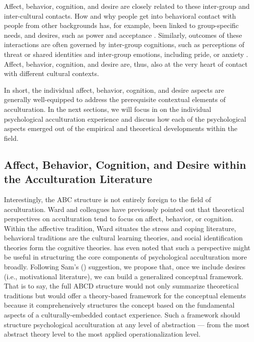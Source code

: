 \documentclass[man, 12pt, a4paper, mask]{apa7}
\begin{document}
Affect, behavior, cognition, and desire are closely related to these inter-group and inter-cultural contacts. How and why people get into behavioral contact with people from other backgrounds has, for example, been linked to group-specific needs, and desires, such as power and acceptance \citep[e.g.,][]{Hassler2021, Shnabel2008a}. Similarly, outcomes of these interactions are often governed by inter-group cognitions, such as perceptions of threat or shared identities \citep[e.g.,][]{Dovidio2017, Stephan2000a} and inter-group emotions, including pride, or anxiety \citep[e.g.,][]{Iyer2008, Stephan1992}. Affect, behavior, cognition, and desire are, thus, also at the very heart of contact with different cultural contexts.

In short, the individual affect, behavior, cognition, and desire aspects are generally well-equipped to address the prerequisite contextual elements of acculturation. In the next sections, we will focus in on the individual psychological acculturation experience and discuss how each of the psychological aspects emerged out of the empirical and theoretical developments within the field. 

\subsection{Affect, Behavior, Cognition, and Desire within the Acculturation Literature}
Interestingly, the ABC structure is not entirely foreign to the field of acculturation. Ward and colleagues \citep{Ward2001, Masgoret2006, Ward2019} have previously pointed out that theoretical perspectives on acculturation tend to focus on affect, behavior, or cognition. Within the affective tradition, Ward situates the stress and coping literature, behavioral traditions are the cultural learning theories, and social identification theories form the cognitive theories. \citet{Sam2006b} has even noted that such a perspective might be useful in structuring the core components of psychological acculturation more broadly. 
Following Sam's (\citeyear{Sam2006b}) suggestion, we propose that, once we include desires (i.e., motivational literature), we can build a generalized conceptual framework. That is to say, the full ABCD structure would not only summarize theoretical traditions but would offer a theory-based framework for the conceptual elements because it comprehensively structures the concept based on the fundamental aspects of a culturally-embedded contact experience. Such a framework should structure psychological acculturation at any level of abstraction --- from the most abstract theory level to the most applied operationalization level. 
\end{document}
